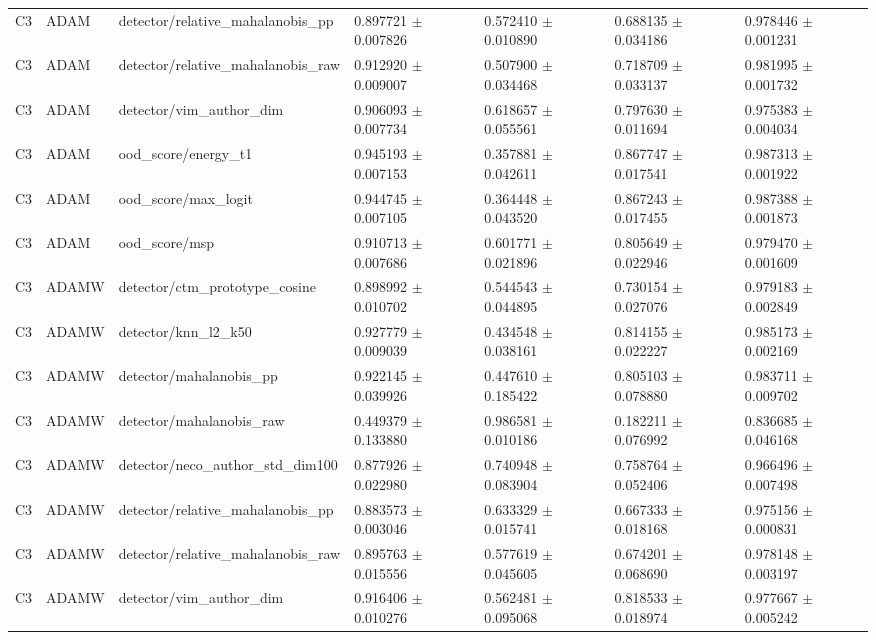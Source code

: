 \begin{longtable}{lllllll}
C3 & ADAM & detector/relative\_mahalanobis\_pp & 0.897721 $\pm$ 0.007826 & 0.572410 $\pm$ 0.010890 & 0.688135 $\pm$ 0.034186 & 0.978446 $\pm$ 0.001231 \\
C3 & ADAM & detector/relative\_mahalanobis\_raw & 0.912920 $\pm$ 0.009007 & 0.507900 $\pm$ 0.034468 & 0.718709 $\pm$ 0.033137 & 0.981995 $\pm$ 0.001732 \\
C3 & ADAM & detector/vim\_author\_dim & 0.906093 $\pm$ 0.007734 & 0.618657 $\pm$ 0.055561 & 0.797630 $\pm$ 0.011694 & 0.975383 $\pm$ 0.004034 \\
C3 & ADAM & ood\_score/energy\_t1 & 0.945193 $\pm$ 0.007153 & 0.357881 $\pm$ 0.042611 & 0.867747 $\pm$ 0.017541 & 0.987313 $\pm$ 0.001922 \\
C3 & ADAM & ood\_score/max\_logit & 0.944745 $\pm$ 0.007105 & 0.364448 $\pm$ 0.043520 & 0.867243 $\pm$ 0.017455 & 0.987388 $\pm$ 0.001873 \\
C3 & ADAM & ood\_score/msp & 0.910713 $\pm$ 0.007686 & 0.601771 $\pm$ 0.021896 & 0.805649 $\pm$ 0.022946 & 0.979470 $\pm$ 0.001609 \\
C3 & ADAMW & detector/ctm\_prototype\_cosine & 0.898992 $\pm$ 0.010702 & 0.544543 $\pm$ 0.044895 & 0.730154 $\pm$ 0.027076 & 0.979183 $\pm$ 0.002849 \\
C3 & ADAMW & detector/knn\_l2\_k50 & 0.927779 $\pm$ 0.009039 & 0.434548 $\pm$ 0.038161 & 0.814155 $\pm$ 0.022227 & 0.985173 $\pm$ 0.002169 \\
C3 & ADAMW & detector/mahalanobis\_pp & 0.922145 $\pm$ 0.039926 & 0.447610 $\pm$ 0.185422 & 0.805103 $\pm$ 0.078880 & 0.983711 $\pm$ 0.009702 \\
C3 & ADAMW & detector/mahalanobis\_raw & 0.449379 $\pm$ 0.133880 & 0.986581 $\pm$ 0.010186 & 0.182211 $\pm$ 0.076992 & 0.836685 $\pm$ 0.046168 \\
C3 & ADAMW & detector/neco\_author\_std\_dim100 & 0.877926 $\pm$ 0.022980 & 0.740948 $\pm$ 0.083904 & 0.758764 $\pm$ 0.052406 & 0.966496 $\pm$ 0.007498 \\
C3 & ADAMW & detector/relative\_mahalanobis\_pp & 0.883573 $\pm$ 0.003046 & 0.633329 $\pm$ 0.015741 & 0.667333 $\pm$ 0.018168 & 0.975156 $\pm$ 0.000831 \\
C3 & ADAMW & detector/relative\_mahalanobis\_raw & 0.895763 $\pm$ 0.015556 & 0.577619 $\pm$ 0.045605 & 0.674201 $\pm$ 0.068690 & 0.978148 $\pm$ 0.003197 \\
C3 & ADAMW & detector/vim\_author\_dim & 0.916406 $\pm$ 0.010276 & 0.562481 $\pm$ 0.095068 & 0.818533 $\pm$ 0.018974 & 0.977667 $\pm$ 0.005242 \\

\end{longtable}
